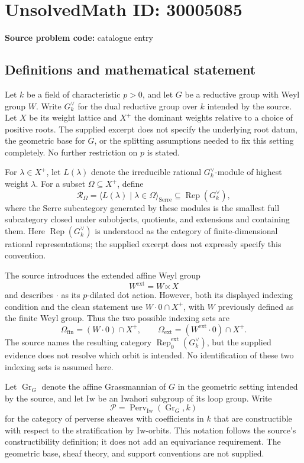 \documentclass[11pt]{article}
\begin{document}
\section*{UnsolvedMath ID: 30005085}
\textbf{Source problem code:} catalogue entry
\subsection{Definitions and mathematical statement}
Let \(k\) be a field of characteristic \(p>0\), and let \(G\) be a reductive group with Weyl group \(W\). Write \(G_k^\vee\) for the dual reductive group over \(k\) intended by the source. Let \(X\) be its weight lattice and \(X^+\) the dominant weights relative to a choice of positive roots. The supplied excerpt does not specify the underlying root datum, the geometric base for \(G\), or the splitting assumptions needed to fix this setting completely. No further restriction on \(p\) is stated.

For \(\lambda\in X^+\), let \(L(\lambda)\) denote the irreducible rational \(G_k^\vee\)-module of highest weight \(\lambda\). For a subset \(\Omega\subseteq X^+\), define
\[
\mathcal R_\Omega
 =\bigl\langle L(\lambda)\mid\lambda\in\Omega\bigr\rangle_{\mathrm{Serre}}
 \subseteq\operatorname{Rep}(G_k^\vee),
\]
where the Serre subcategory generated by these modules is the smallest full subcategory closed under subobjects, quotients, and extensions and containing them. Here \(\operatorname{Rep}(G_k^\vee)\) is understood as the category of finite-dimensional rational representations; the supplied excerpt does not expressly specify this convention.

The source introduces the extended affine Weyl group
\[
W^{\mathrm{ext}}=W\ltimes X
\]
and describes \(\mathbin{\cdot}\) as its \(p\)-dilated dot action. However, both its displayed indexing condition and the clean statement use \(W\mathbin{\cdot}0\cap X^+\), with \(W\) previously defined as the finite Weyl group. Thus the two possible indexing sets are
\[
\Omega_{\mathrm{fin}}=(W\mathbin{\cdot}0)\cap X^+,
\qquad
\Omega_{\mathrm{ext}}=(W^{\mathrm{ext}}\mathbin{\cdot}0)\cap X^+.
\]
The source names the resulting category \(\operatorname{Rep}^{\mathrm{ext}}_0(G_k^\vee)\), but the supplied evidence does not resolve which orbit is intended. No identification of these two indexing sets is assumed here.

Let \(\operatorname{Gr}_G\) denote the affine Grassmannian of \(G\) in the geometric setting intended by the source, and let \(\mathrm{Iw}\) be an Iwahori subgroup of its loop group. Write
\[
\mathcal P=\operatorname{Perv}_{\mathrm{Iw}}(\operatorname{Gr}_G,k)
\]
for the category of perverse sheaves with coefficients in \(k\) that are constructible with respect to the stratification by \(\mathrm{Iw}\)-orbits. This notation follows the source's constructibility definition; it does not add an equivariance requirement. The geometric base, sheaf theory, and support conventions are not supplied.
\end{document}
